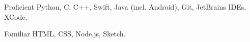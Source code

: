 
\begin{cvskills}

	\cvskill
	{Proficient} %
	{Python, C, C++,  Swift, Java (incl. Android), Git, JetBrains IDEs, XCode.} %

	\cvskill
	{Familiar\hphantom{9} } %
	{HTML, CSS, Node.js, Sketch.} %


    

\end{cvskills}
